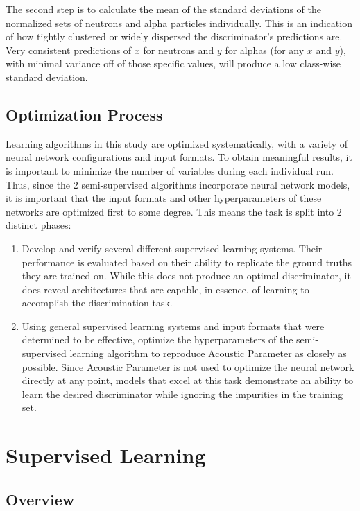 \documentclass[10pt]{article}
\begin{document}
The second step is to calculate the mean of the standard deviations of the normalized sets of neutrons and alpha particles individually. This is an indication of how tightly clustered or widely dispersed the discriminator’s predictions are. Very consistent predictions of $x$ for neutrons and $y$ for alphas (for any $x$ and $y$), with minimal variance off of those specific values, will produce a low class-wise standard deviation.

\subsection{Optimization Process}

Learning algorithms in this study are optimized systematically, with a variety of neural network configurations and input formats. To obtain meaningful results, it is important to minimize the number of variables during each individual run. Thus, since the 2 semi-supervised algorithms incorporate neural network models, it is important that the input formats and other hyperparameters of these networks are optimized first to some degree. This means the task is split into 2 distinct phases:

\begin{enumerate}
    \item Develop and verify several different supervised learning systems. Their performance is evaluated based on their ability to replicate the ground truths they are trained on. While this does not produce an optimal discriminator, it does reveal architectures that are capable, in essence, of learning to accomplish the discrimination task.
    \item Using general supervised learning systems and input formats that were determined to be effective, optimize the hyperparameters of the semi-supervised learning algorithm to reproduce Acoustic Parameter as closely as possible. Since Acoustic Parameter is not used to optimize the neural network directly at any point, models that excel at this task demonstrate an ability to learn the desired discriminator while ignoring the impurities in the training set.
\end{enumerate}

\section{Supervised Learning}

\subsection{Overview}
\end{document}
